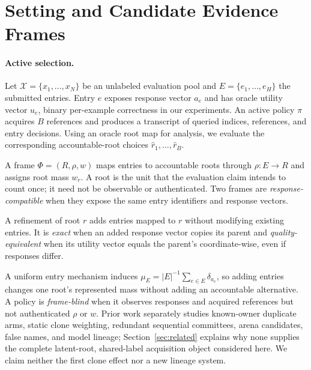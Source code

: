 \section{Setting and Candidate Evidence Frames}
\label{sec:setting}

\paragraph{Active selection.}
Let $\mathcal{X}=\{x_1,\ldots,x_N\}$ be an unlabeled evaluation pool and $E=\{e_1,\ldots,e_H\}$ the submitted entries. Entry $e$ exposes response vector $a_e$ and has oracle utility vector $u_e$, binary per-example correctness in our experiments. An active policy $\pi$ acquires $B$ references and produces a transcript of queried indices, references, and entry decisions. Using an oracle root map for analysis, we evaluate the corresponding accountable-root choices $\widehat r_1,\ldots,\widehat r_B$.

\begin{definition}
A frame $\Phi=(R,\rho,w)$ maps entries to accountable roots through $\rho:E\rightarrow R$ and assigns root mass $w_r$. A root is the unit that the evaluation claim intends to count once; it need not be observable or authenticated. Two frames are \emph{response-compatible} when they expose the same entry identifiers and response vectors.
\end{definition}

\begin{definition}
A refinement of root $r$ adds entries mapped to $r$ without modifying existing entries. It is \emph{exact} when an added response vector copies its parent and \emph{quality-equivalent} when its utility vector equals the parent's coordinate-wise, even if responses differ.
\end{definition}

A uniform entry mechanism induces $\mu_E=|E|^{-1}\sum_{e\in E}\delta_{a_e}$, so adding entries changes one root's represented mass without adding an accountable alternative. A policy is \emph{frame-blind} when it observes responses and acquired references but not authenticated $\rho$ or $w$. Prior work separately studies known-owner duplicate arms, static clone weighting, redundant sequential committees, arena candidates, false names, and model lineage; Section~\ref{sec:related} explains why none supplies the complete latent-root, shared-label acquisition object considered here. We claim neither the first clone effect nor a new lineage system.

